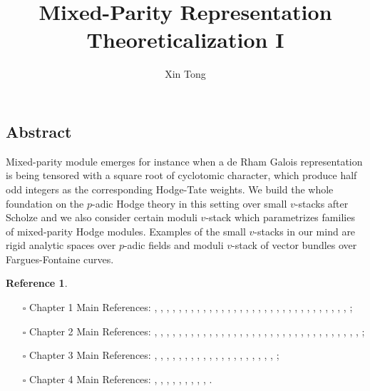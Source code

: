 \documentclass[12pt]{book}
\title{Mixed-Parity Representation Theoreticalization I}
\author{Xin Tong}
\date{}
\theoremstyle{definition}
\newtheorem{reference}{Reference}
\begin{document}
\maketitle



\newpage
\subsection*{Abstract}
Mixed-parity module emerges for instance when a de Rham Galois representation is being tensored with a square root of cyclotomic character, which produce half odd integers as the corresponding Hodge-Tate weights. We build the whole foundation on the $p$-adic Hodge theory in this setting over small $v$-stacks after Scholze and we also consider certain moduli $v$-stack which parametrizes families of mixed-parity Hodge modules. Examples of the small $v$-stacks in our mind are rigid analytic spaces over $p$-adic fields and moduli $v$-stack of vector bundles over Fargues-Fontaine curves. 



\newpage
\tableofcontents

\newpage



\begin{reference}\mbox{}
\begin{itemize}
\item[$\square$] Chapter 1 Main References: \cite{Sch1}, \cite{KL1}, \cite{KL2}, \cite{BL1}, \cite{BL2}, \cite{BS}, \cite{BHS}, \cite{Fon1}, \cite{CS1}, \cite{CS2}, \cite{BK}, \cite{BBK}, \cite{BBBK}, \cite{KKM}, \cite{KM}, \cite{LZ}, \cite{TT}, \cite{B}, \cite{Shi}, \cite{AI1}, \cite{AI2}, \cite{AI3}, \cite{AB1}, \cite{AB2}, \cite{Fon2}, \cite{Fon3}, \cite{Fa1}, \cite{M}, \cite{Fa2}, \cite{Fa3}, \cite{Fon4}, \cite{Fon5}, \cite{Fon6}; 
\item[$\square$] Chapter 2 Main References: \cite{Sch1}, \cite{Sch2}, \cite{FS}, \cite{KL1}, \cite{KL2}, \cite{BL1}, \cite{BL2}, \cite{BS}, \cite{BHS}, \cite{Fon1}, \cite{CS1}, \cite{CS2}, \cite{BK}, \cite{BBK}, \cite{BBBK}, \cite{KKM}, \cite{KM}, \cite{LZ}, \cite{TT}, \cite{B}, \cite{Shi}, \cite{AI1}, \cite{AI2}, \cite{AI3}, \cite{AB1}, \cite{AB2}, \cite{Fon2}, \cite{Fon3}, \cite{Fa1}, \cite{M}, \cite{Fa2}, \cite{Fa3}, \cite{Fon4}, \cite{Fon5}, \cite{Fon6};
\item[$\square$] Chapter 3 Main References: \cite{Sch1}, \cite{Sch2}, \cite{FS}, \cite{FF}, \cite{KL1}, \cite{KL2}, \cite{BL1}, \cite{BL2}, \cite{BS}, \cite{BHS}, \cite{Fon1}, \cite{CS1}, \cite{CS2}, \cite{BK}, \cite{BBK}, \cite{BBBK}, \cite{KKM}, \cite{KM}, \cite{LBV}, \cite{B}, \cite{SW};
\item[$\square$] Chapter 4 Main References: \cite{FS}, \cite{FF}, \cite{Sch1}, \cite{Sch2}, \cite{KL1}, \cite{KL2}, \cite{LBV}, \cite{B}, \cite{SW}, \cite{BS}.
\end{itemize}
\end{reference}
\end{document}
